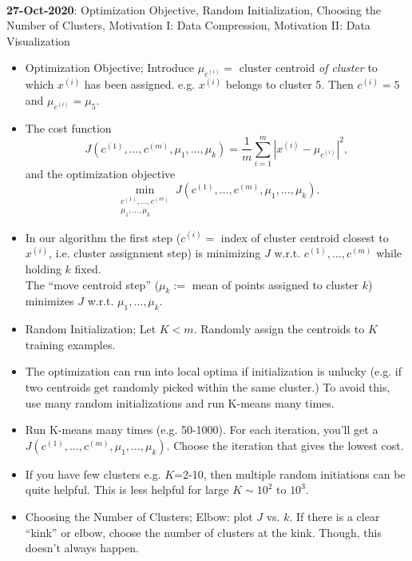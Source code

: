 \documentclass[10pt]{article}
\begin{document}
\hfill \\
{\large \textbf{27-Oct-2020}: Optimization Objective, Random Initialization, Choosing the Number of Clusters, Motivation I: Data Compression, Motivation II: Data Visualization}
\begin{itemize}
  \item Optimization Objective; Introduce $\mu_{c^{(i)}}=$ cluster centroid \textit{of cluster} to which $x^{(i)}$ has been assigned. e.g. $x^{(i)}$ belongs to cluster 5. Then $c^{(i)}=5$ and $\mu_{c^{(i)}}=\mu_5$.
  \item The cost function
    \begin{equation*}
      J(c^{(1)},\dots,c^{(m)},\mu_1,\dots,\mu_k) = \frac{1}{m} \sum_{i=1}^m \left| x^{(i)} - \mu_{c^{(i)}} \right|^2,
    \end{equation*}
    and the optimization objective
    \begin{equation*}
      \min_{\substack{c^{(1)},\dots,c^{(m)} \\ \mu_1,\dots,\mu_k}} J\left(c^{(1)},\dots,c^{(m)},\mu_1,\dots,\mu_k\right).
    \end{equation*}
  \item In our algorithm the first step ($c^{(i)}=$ index of cluster
    centroid closest to $x^{(i)}$, i.e. cluster assignment step) is
    minimizing $J$ w.r.t. $c^{(1)},\dots,c^{(m)}$ while holding $k$
    fixed. \\ The ``move centroid step'' ($\mu_k:=$ mean of points
    assigned to cluster $k$) minimizes $J$ w.r.t. $\mu_1,\dots,\mu_k$.
  \item Random Initialization; Let $K<m$. Randomly assign the centroids to $K$ training examples.
  \item The optimization can run into local optima if initialization
    is unlucky (e.g. if two centroids get randomly picked within the
    same cluster.) To avoid this, use many random initializations and
    run K-means many times.
  \item Run K-means many times (e.g. 50-1000). For each iteration, you'll get a $J\left(c^{(1)},\dots,c^{(m)},\mu_1,\dots,\mu_k\right)$. Choose the iteration that gives the lowest cost.
  \item If you have few clusters e.g. $K$=2-10, then multiple random initiations can be quite helpful. This is less helpful for large $K \sim 10^2 \text{ to } 10^3$.
  \item Choosing the Number of Clusters; Elbow: plot $J$ vs. $k$. If there is a clear ``kink'' or elbow, choose the number of clusters at the kink. Though, this doesn't always happen.

\end{itemize}
\end{document}
